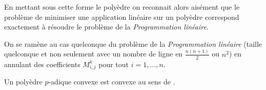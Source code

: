 En mettant sous cette forme le polyèdre on reconnait alors aisément que le problème de minimiser une application linéaire sur un polyèdre correspond exactement à résoudre le problème de la \textit{Programmation linéaire}.

\begin{remarque}
	On se ramène au cas quelconque du problème de la \textit{Programmation linéaire} (taille quelconque et non seulement avec un nombre de ligne en $\frac{n(n+1)}{2}$ ou $n^2$) en annulant des coefficients $M^k_{i,j}$ pour tout $i=1,\ldots,n$.   
\end{remarque}

\begin{propriete}
Un polyèdre $p$-adique convexe est convexe au sens de \cite{monna_ensembles_1958}.  
\end{propriete}

\fi
